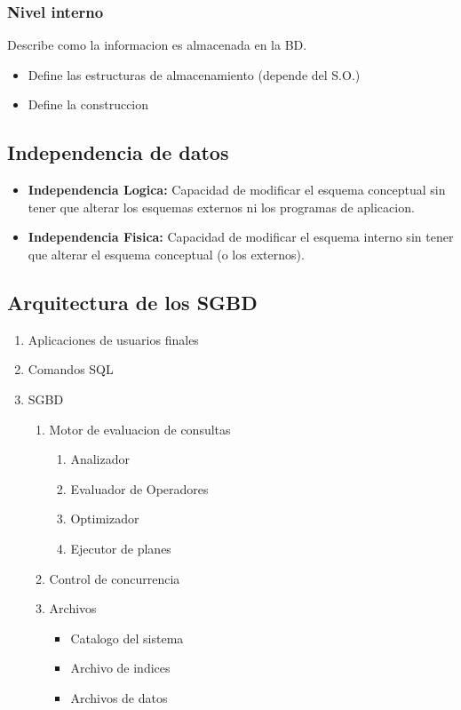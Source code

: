 \documentclass[twoside]{article}
\begin{document}
\subsubsection{Nivel interno}

Describe como la informacion es almacenada en la BD.

\begin{itemize}
  \item Define las estructuras de almacenamiento (depende del S.O.)
  \item Define la construccion
\end{itemize}

\subsection{Independencia de datos}

\begin{itemize}
  \item \textbf{Independencia Logica:} Capacidad de modificar el esquema conceptual sin tener que alterar los esquemas externos ni los programas de aplicacion.
  \item \textbf{Independencia Fisica:} Capacidad de modificar el esquema interno sin tener que alterar el esquema conceptual (o los externos).
\end{itemize}

\subsection{Arquitectura de los SGBD}

\begin{enumerate}
  \item Aplicaciones de usuarios finales
  \item Comandos SQL
  \item SGBD
  \begin{enumerate}
    \item Motor de evaluacion de consultas
    \begin{enumerate}
      \item Analizador
      \item Evaluador de Operadores
      \item Optimizador
      \item Ejecutor de planes
    \end{enumerate}
    \item Control de concurrencia
    \item Archivos
    \begin{itemize}
      \item Catalogo del sistema
      \item Archivo de indices
      \item Archivos de datos
    \end{itemize}
  \end{enumerate}
\end{enumerate}
\end{document}
